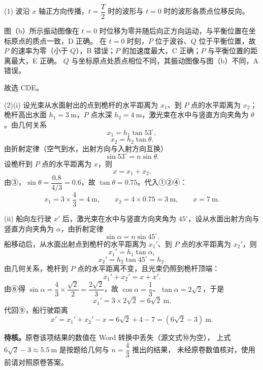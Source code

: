 \begin{answer}
(1) 波沿 $x$ 轴正方向传播，$t=\dfrac{T}{2}$ 时的波形与 $t=0$ 时的波形各质点位移反向。

图（b）所示振动图像在 $t=0$ 时位移为零并随后向正方向运动，与平衡位置在坐标原点的质点一致，D 正确。
在 $t=0$ 时刻，$P$ 位于波谷、$Q$ 位于平衡位置，故 $P$ 的速率为零（小于 $Q$），B 错误；$P$ 的加速度最大，C 正确；$P$ 与平衡位置的距离最大，E 正确。
$Q$ 与坐标原点处质点相位不同，其振动图像与图（b）不同，A 错误。

故选 CDE。

(2)(i) 设光束从水面射出的点到桅杆的水平距离为 $x_{1}$、到 $P$ 点的水平距离为 $x_{2}$；桅杆高出水面 $h_{1}=\SI{3}{\metre}$，$P$ 点水深 $h_{2}=\SI{4}{\metre}$，激光束在水中与竖直方向夹角为 $\theta$。由几何关系
\[
  x_{1}=h_{1}\tan53^{\circ}, \tag{①}
\]
\[
  x_{2}=h_{2}\tan\theta. \tag{②}
\]
由折射定律（空气到水，出射方向与入射方向互换）
\[
  \sin53^{\circ}=n\sin\theta. \tag{③}
\]
设桅杆到 $P$ 点的水平距离为 $x$，则
\[
  x=x_{1}+x_{2}. \tag{④}
\]
由③，$\sin\theta=\dfrac{0.8}{4/3}=0.6$，故 $\tan\theta=0.75$。代入①②④：
\[
  x_{1}=3\times\frac{4}{3}=\SI{4}{\metre},\qquad
  x_{2}=4\times0.75=\SI{3}{\metre},\qquad
  x=\SI{7}{\metre}.
\]

(ii) 船向左行驶 $x'$ 后，激光束在水中与竖直方向夹角为 $45^{\circ}$，设从水面出射方向与竖直方向夹角为 $\alpha$，由折射定律
\[
  \sin\alpha=n\sin45^{\circ}. \tag{⑥}
\]
船移动后，从水面出射点到桅杆的水平距离为 $x_{1}'$、到 $P$ 点的水平距离为 $x_{2}'$，则
\[
  x_{1}'=h_{1}\tan\alpha, \tag{⑦}
\]
\[
  x_{2}'=h_{2}\tan45^{\circ}=h_{2}. \tag{⑧}
\]
由几何关系，桅杆到 $P$ 点的水平距离不变，且光束仍照到桅杆顶端：
\[
  x_{1}'+x_{2}'=x+x'. \tag{⑨}
\]
由⑥得 $\sin\alpha=\dfrac{4}{3}\times\dfrac{\sqrt{2}}{2}=\dfrac{2\sqrt{2}}{3}$，故 $\cos\alpha=\dfrac{1}{3}$、$\tan\alpha=2\sqrt{2}$，于是
\[
  x_{1}'=3\times2\sqrt{2}=6\sqrt{2}\ \mathrm{m}.
\]
代回⑨，船行驶距离
\[
  x'=x_{1}'+x_{2}'-x=6\sqrt{2}+4-7=\left(6\sqrt{2}-3\right)\ \mathrm{m}.
\]
\begin{gktip}
\textbf{待核。}原卷该项结果的数值在 Word 转换中丢失（源文式⑩为空），
上式 $6\sqrt{2}-3\approx\SI{5.5}{\metre}$ 是按题给几何与 $n=\dfrac{4}{3}$ 推出的结果，
未经原卷数值核对，使用前请对照原卷答案。
\end{gktip}
\end{answer}

